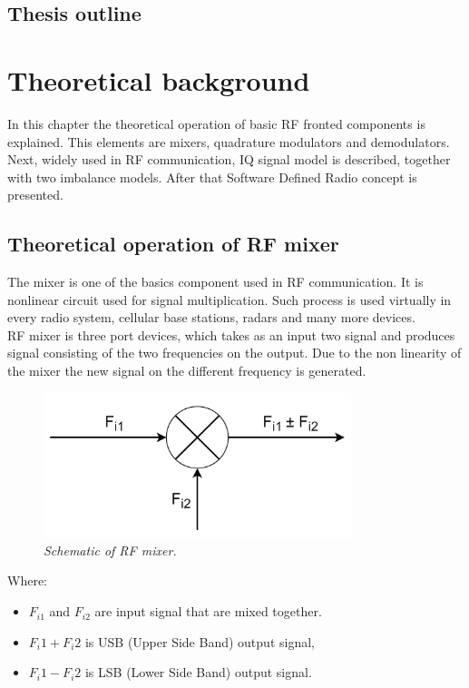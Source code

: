 \documentclass[en,printmode]{mgr}
\begin{document}
	\section{Thesis outline}
	
\chapter{Theoretical background}
	In this chapter the theoretical operation of basic RF fronted components is explained. This elements
	are mixers, quadrature modulators and demodulators. Next, widely used in RF communication, IQ signal model
	is described, together with two imbalance models. After that Software Defined Radio concept is presented.

	\section{Theoretical operation of RF mixer}
		The mixer is one of the basics component used in RF communication. It is nonlinear circuit used for
		signal multiplication. Such process is used virtually in every radio system, cellular base stations,
		radars and many more devices. 
		\\
		
		RF mixer is three port devices, which takes as an input two signal and produces signal consisting of 
		the two frequencies on the output. Due to the non linearity of the mixer the new signal on the different
		frequency is generated.
		
		\begin{figure}[!htb]
    		\centering
   			\includegraphics[width=0.8\textwidth]{diag/mixer.png}
    		\caption{\textit{Schematic of RF mixer.}}
		\end{figure}
		
		Where:
		\begin{itemize}
			\item $F_{i1}$ and $F_{i2}$ are input signal that are mixed together.
			\item $F_i1 + F_i2$ is USB (Upper Side Band) output signal,
			\item $F_i1 - F_i2$ is LSB (Lower Side Band) output signal.
		\end{itemize}
		
\end{document}
